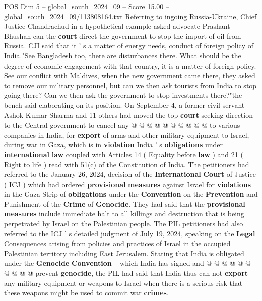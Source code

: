 \begin{textsample}{POS Dim 5 – global\_south\_2024\_09 – Score 15.00 – global\_south\_2024\_09/113808164.txt}
Referring to ingoing Russia-Ukraine, Chief Justice Chandrachud in a hypothetical example asked advocate Prashant Bhushan can the \textbf{court} direct the government to stop the import of oil from Russia.
CJI said that it ' s a matter of energy needs, conduct of foreign policy of India."See Bangladesh too, there are disturbances there.
What should be the degree of economic engagement with that country, it is a matter of foreign policy.
See our conflict with Maldives, when the new government came there, they asked to remove our military personnel, but can we then ask tourists from India to stop going there?
Can we then ask the government to stop investments there?"the bench said elaborating on its position.
On September 4, a former civil servant Ashok Kumar Sharma and 11 others had moved the top \textbf{court} seeking direction to the Central government to cancel any @ @ @ @ @ @ @ @ @ @ to various companies in India, for \textbf{export} of arms and other military equipment to Israel, during war in Gaza, which is in \textbf{violation} India ' s \textbf{obligations} under \textbf{international} \textbf{law} coupled with Articles 14 ( Equality before \textbf{law} ) and 21 ( Right to life ) read with 51(c) of the Constitution of India.
The petitioners had referred to the January 26, 2024, decision of the \textbf{International} \textbf{Court} of Justice ( ICJ ) which had ordered \textbf{provisional} \textbf{measures} against Israel for \textbf{violations} in the Gaza Strip of \textbf{obligations} under the \textbf{Convention} on the \textbf{Prevention} and Punishment of the \textbf{Crime} of \textbf{Genocide}.
They had said that the \textbf{provisional} \textbf{measures} include immediate halt to all killings and destruction that is being perpetrated by Israel on the Palestinian people.
The PIL petitioners had also referred to the ICJ ' s detailed judgment of July 19, 2024, speaking on the \textbf{Legal} Consequences arising from policies and practices of Israel in the occupied Palestinian territory including East Jerusalem.
Stating that India is obligated under the \textbf{Genocide} \textbf{Convention} -- which India has signed and @ @ @ @ @ @ @ @ @ @ prevent \textbf{genocide}, the PIL had said that India thus can not \textbf{export} any military equipment or weapons to Israel when there is a serious risk that these weapons might be used to commit war \textbf{crimes}.

\end{textsample}
